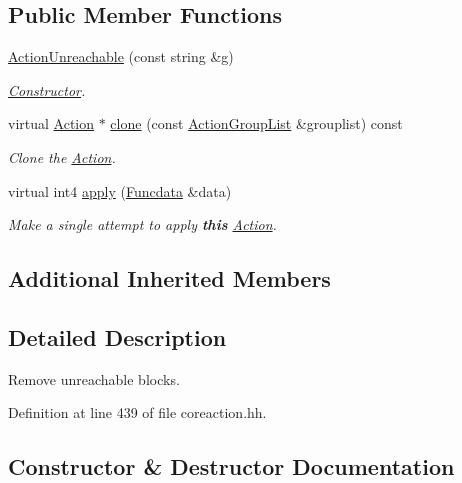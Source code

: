 \subsection*{Public Member Functions}
\begin{DoxyCompactItemize}
\item 
\mbox{\hyperlink{class_action_unreachable_a57b01cb2a918a97c77977cb76fa7c745}{Action\+Unreachable}} (const string \&g)
\begin{DoxyCompactList}\small\item\em \mbox{\hyperlink{class_constructor}{Constructor}}. \end{DoxyCompactList}\item 
virtual \mbox{\hyperlink{class_action}{Action}} $\ast$ \mbox{\hyperlink{class_action_unreachable_a75b11d02821280b8ae5b02fcc082a13a}{clone}} (const \mbox{\hyperlink{class_action_group_list}{Action\+Group\+List}} \&grouplist) const
\begin{DoxyCompactList}\small\item\em Clone the \mbox{\hyperlink{class_action}{Action}}. \end{DoxyCompactList}\item 
virtual int4 \mbox{\hyperlink{class_action_unreachable_a9dd250eba93553aad31aa38168d7c301}{apply}} (\mbox{\hyperlink{class_funcdata}{Funcdata}} \&data)
\begin{DoxyCompactList}\small\item\em Make a single attempt to apply {\bfseries{this}} \mbox{\hyperlink{class_action}{Action}}. \end{DoxyCompactList}\end{DoxyCompactItemize}
\subsection*{Additional Inherited Members}


\subsection{Detailed Description}
Remove unreachable blocks. 

Definition at line 439 of file coreaction.\+hh.



\subsection{Constructor \& Destructor Documentation}
\mbox{\label{class_action_unreachable_a57b01cb2a918a97c77977cb76fa7c745}} 

